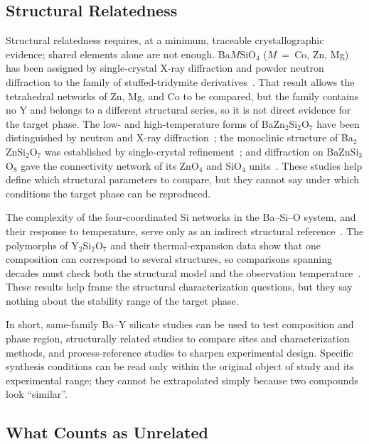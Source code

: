 \subsection{Structural Relatedness}

Structural relatedness requires, at a minimum, traceable crystallographic evidence; shared elements alone are not enough. Ba$M$SiO$_4$ ($M$~=~Co, Zn, Mg) has been assigned by single-crystal X-ray diffraction and powder neutron diffraction to the family of stuffed-tridymite derivatives~\cite{liu1993structures}. That result allows the tetrahedral networks of Zn, Mg, and Co to be compared, but the family contains no Y and belongs to a different structural series, so it is not direct evidence for the target phase. The low- and high-temperature forms of BaZn$_2$Si$_2$O$_7$ have been distinguished by neutron and X-ray diffraction~\cite{lin1999phase}; the monoclinic structure of Ba$_2$ZnSi$_2$O$_7$ was established by single-crystal refinement~\cite{kaiser2002crystal}; and diffraction on BaZnSi$_3$O$_8$ gave the connectivity network of its ZnO$_4$ and SiO$_4$ units~\cite{zou2021crystal}. These studies help define which structural parameters to compare, but they cannot say under which conditions the target phase can be reproduced.

The complexity of the four-coordinated Si networks in the Ba--Si--O system, and their response to temperature, serve only as an indirect structural reference~\cite{gorelova2016thermal}. The polymorphs of Y$_2$Si$_2$O$_7$ and their thermal-expansion data show that one composition can correspond to several structures, so comparisons spanning decades must check both the structural model and the observation temperature~\cite{dolan2008structures,becerro2004revision}. These results help frame the structural characterization questions, but they say nothing about the stability range of the target phase.

In short, same-family Ba--Y silicate studies can be used to test composition and phase region, structurally related studies to compare sites and characterization methods, and process-reference studies to sharpen experimental design. Specific synthesis conditions can be read only within the original object of study and its experimental range; they cannot be extrapolated simply because two compounds look ``similar''.

\subsection{What Counts as Unrelated}

